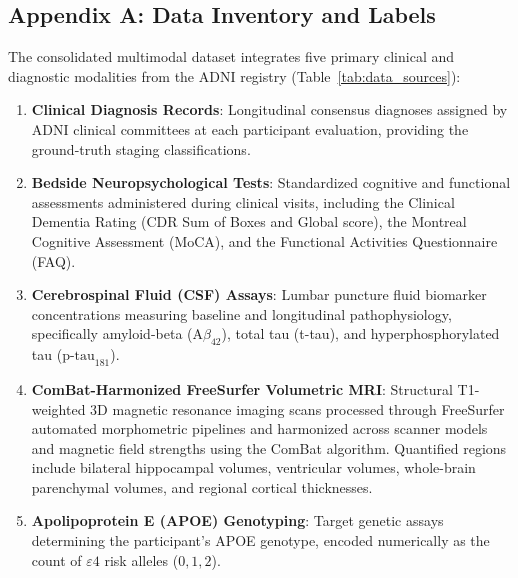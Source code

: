 \documentclass[11pt,a4paper]{article}
\begin{document}
\subsection*{Appendix A: Data Inventory and Labels}
\label{app:data_inventory}
The consolidated multimodal dataset integrates five primary clinical and diagnostic modalities from the ADNI registry (Table~\ref{tab:data_sources}):
\begin{enumerate}
    \item \textbf{Clinical Diagnosis Records}: Longitudinal consensus diagnoses assigned by ADNI clinical committees at each participant evaluation, providing the ground-truth staging classifications.
    \item \textbf{Bedside Neuropsychological Tests}: Standardized cognitive and functional assessments administered during clinical visits, including the Clinical Dementia Rating (CDR Sum of Boxes and Global score), the Montreal Cognitive Assessment (MoCA), and the Functional Activities Questionnaire (FAQ).
    \item \textbf{Cerebrospinal Fluid (CSF) Assays}: Lumbar puncture fluid biomarker concentrations measuring baseline and longitudinal pathophysiology, specifically amyloid-beta ($\text{A}\beta_{42}$), total tau (t-tau), and hyperphosphorylated tau ($\text{p-tau}_{181}$).
    \item \textbf{ComBat-Harmonized FreeSurfer Volumetric MRI}: Structural T1-weighted 3D magnetic resonance imaging scans processed through FreeSurfer automated morphometric pipelines and harmonized across scanner models and magnetic field strengths using the ComBat algorithm. Quantified regions include bilateral hippocampal volumes, ventricular volumes, whole-brain parenchymal volumes, and regional cortical thicknesses.
    \item \textbf{Apolipoprotein E (APOE) Genotyping}: Target genetic assays determining the participant's APOE genotype, encoded numerically as the count of $\varepsilon4$ risk alleles ($0, 1, 2$).
\end{enumerate}


\end{document}
